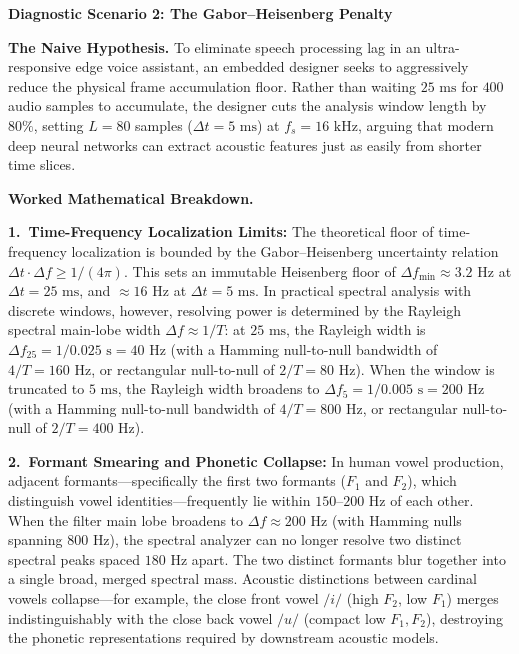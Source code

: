 \documentclass[11pt,a4paper]{article}
\newcommand{\diagsec}[1]{\vspace{1.6pt}\textbf{\large #1}\vspace{0.5pt}\par}
\begin{document}
\clearpage
\diagsec{Diagnostic Scenario 2: The Gabor--Heisenberg Penalty}

\textbf{The Naive Hypothesis.} To eliminate speech processing lag in an ultra-responsive edge voice assistant, an embedded designer seeks to aggressively reduce the physical frame accumulation floor. Rather than waiting $25\text{ ms}$ for $400$ audio samples to accumulate, the designer cuts the analysis window length by $80\%$, setting $L = 80$ samples ($\Delta t = 5\text{ ms}$) at $f_s = 16\text{ kHz}$, arguing that modern deep neural networks can extract acoustic features just as easily from shorter time slices.

\textbf{Worked Mathematical Breakdown.}

\textbf{1.~Time-Frequency Localization Limits:} The theoretical floor of time-frequency localization is bounded by the Gabor--Heisenberg uncertainty relation $\Delta t \cdot \Delta f \ge 1 / (4\pi)$. This sets an immutable Heisenberg floor of $\Delta f_{\text{min}} \approx 3.2\text{ Hz}$ at $\Delta t = 25\text{ ms}$, and $\approx 16\text{ Hz}$ at $\Delta t = 5\text{ ms}$. In practical spectral analysis with discrete windows, however, resolving power is determined by the Rayleigh spectral main-lobe width $\Delta f \approx 1/T$: at $25\text{ ms}$, the Rayleigh width is $\Delta f_{25} = 1/0.025\text{ s} = 40\text{ Hz}$ (with a Hamming null-to-null bandwidth of $4/T = 160\text{ Hz}$, or rectangular null-to-null of $2/T = 80\text{ Hz}$). When the window is truncated to $5\text{ ms}$, the Rayleigh width broadens to $\Delta f_5 = 1/0.005\text{ s} = 200\text{ Hz}$ (with a Hamming null-to-null bandwidth of $4/T = 800\text{ Hz}$, or rectangular null-to-null of $2/T = 400\text{ Hz}$).

\textbf{2.~Formant Smearing and Phonetic Collapse:} In human vowel production, adjacent formants---specifically the first two formants ($F_1$ and $F_2$), which distinguish vowel identities---frequently lie within $150\text{--}200\text{ Hz}$ of each other. When the filter main lobe broadens to $\Delta f \approx 200\text{ Hz}$ (with Hamming nulls spanning $800\text{ Hz}$), the spectral analyzer can no longer resolve two distinct spectral peaks spaced $180\text{ Hz}$ apart. The two distinct formants blur together into a single broad, merged spectral mass. Acoustic distinctions between cardinal vowels collapse---for example, the close front vowel $/i/$ (high $F_2$, low $F_1$) merges indistinguishably with the close back vowel $/u/$ (compact low $F_1, F_2$), destroying the phonetic representations required by downstream acoustic models.
\end{document}

